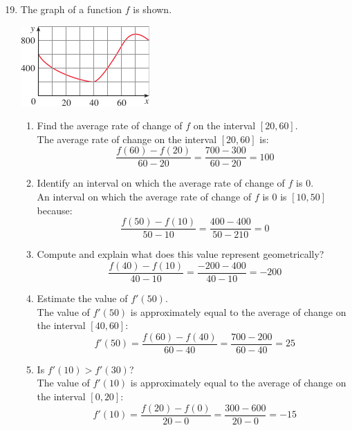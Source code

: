 \documentclass[12pt]{article}
\begin{document}
\begin{enumerate}
    \setcounter{enumi}{18}
    \item The graph of a function $f$ is shown.
          \begin{center}
              \includegraphics{Images/Image-1.png}
          \end{center}
          \begin{enumerate}
              \item Find the average rate of change of $f$ on the interval $[20, 60]$.\\
                    The average rate of change on the interval $[20, 60]$ is:
                    \[{\displaystyle \frac{f(60) - f(20)}{60 - 20} = \frac{700 - 300}{60 - 20}} = \boxed{100}\]
              \item Identify an interval on which the average rate of change of $f$ is 0.\\
                    An interval on which the average rate of change of $f$ is 0 is $\boxed{[10, 50]}$ because:
                    \[{\displaystyle \frac{f(50) - f(10)}{50 - 10} = \frac{400 - 400}{50 - 210}} = 0\]
              \item Compute and explain what does this value represent geometrically?
                    \[{\displaystyle \frac{f(40) - f(10)}{40-10}} = \boxed{\frac{-200 -400}{40-10} = -200}\]
                    \noindent{}
              \item Estimate the value of $f'(50)$.\\
                    The value of $f'(50)$ is approximately equal to the average of change on the interval $[40,60]$:
                    \[f'(50) = {\displaystyle \frac{f(60) - f(40)}{60 - 40} = \frac{700 - 200}{60 - 40}} = \boxed{25}\]
              \item Is $f'(10) > f'(30)$?\\
                    The value of $f'(10)$ is approximately equal to the average of change on the interval $[0,20]$:
                    \[f'(10) = {\displaystyle \frac{f(20) - f(0)}{20 - 0} = \frac{300 - 600}{20 - 0}} = -15\]

\end{enumerate}
\end{enumerate}
\end{document}
